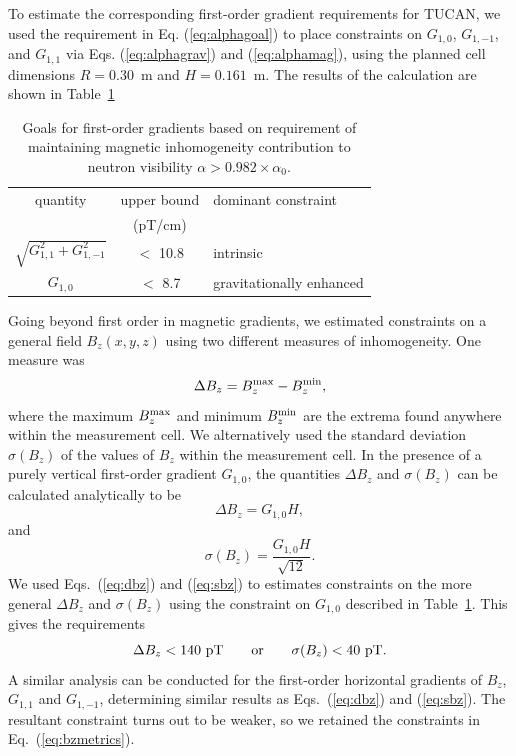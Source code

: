 \documentclass[preprint,12pt]{elsarticle}
\begin{document}
To estimate the corresponding first-order gradient requirements for
TUCAN, we used the requirement in Eq. (\ref{eq:alphagoal}) to place
constraints on $G_{1,0}$, $G_{1,-1}$, and $G_{1,1}$ via
Eqs. (\ref{eq:alphagrav}) and (\ref{eq:alphamag}), using the planned
cell dimensions $R=0.30$~m and $H=0.161$~m.  The results of the
calculation are shown in Table~\ref{tab:ggoal}
\begin{table}
  \begin{center}
    \begin{tabular}{ccl}
      quantity & upper bound & dominant constraint\\
               & (pT/cm) & \\\hline
      $\sqrt{G_{1,1}^2+G_{1,-1}^2}$ & $<$ 10.8 & intrinsic\\
      $G_{1,0}$ & $<$ 8.7 & gravitationally enhanced
    \end{tabular}
    \caption{Goals for first-order gradients based on requirement of
      maintaining magnetic inhomogeneity contribution to neutron
      visibility $\alpha>0.982\times\alpha_0$.\label{tab:ggoal}}
  \end{center}
\end{table}

Going beyond first order in magnetic gradients, we estimated
constraints on a general field $B_z(x,y,z)$ using two different
measures of inhomogeneity.  One measure was
\begin{equation}
  \Delta B_z = B_z^{\rm max}-B_z^{\rm min},
\end{equation}
where the maximum $B_z^{\rm max}$ and minimum $B_z^{\rm min}$ are the
extrema found anywhere within the measurement cell.  We alternatively
used the standard deviation $\sigma(B_z)$ of the values of $B_z$
within the measurement cell.  In the presence of a purely vertical
first-order gradient $G_{1,0}$, the quantities $\Delta B_z$ and
$\sigma(B_z)$ can be calculated analytically to be
\begin{equation}
  \Delta B_z = G_{1,0}H,
  \label{eq:dbz}
\end{equation}
and
\begin{equation}
  \sigma(B_z)=\frac{G_{1,0}H}{\sqrt{12}}.
  \label{eq:sbz}
\end{equation}
We used Eqs.~(\ref{eq:dbz}) and (\ref{eq:sbz}) to estimates
constraints on the more general $\Delta B_z$ and $\sigma(B_z)$ using
the constraint on $G_{1,0}$ described in Table~\ref{tab:ggoal}.  This
gives the requirements
\begin{equation}
  \Delta B_z<140~{\rm pT}
  \qquad\text{or}\qquad
  \sigma(B_z)<40~{\rm pT}.
  \label{eq:bzmetrics}
\end{equation}
A similar analysis can be conducted for the first-order horizontal
gradients of $B_z$, $G_{1,1}$ and $G_{1,-1}$, determining similar
results as Eqs.~(\ref{eq:dbz}) and (\ref{eq:sbz}).  The resultant
constraint turns out to be weaker, so we retained the constraints in
Eq.~(\ref{eq:bzmetrics}).
\end{document}
